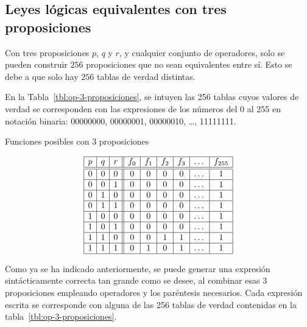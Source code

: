 \subsection{Leyes lógicas equivalentes con tres proposiciones}

Con tres proposiciones $p$, $q$ y $r$, y cualquier conjunto de operadores,
solo se pueden construir $256$ proposiciones que no sean equivalentes entre
sí. Esto se debe a que solo hay $256$ tablas de verdad distintas.

En la Tabla~\ref{tbl:op-3-proposiciones}, se intuyen las 256 tablas cuyos
valores de verdad se corresponden con las expresiones de los números del 0
al 255 en notación binaria: 00000000, 00000001, 00000010, \ldots, 11111111.


\begin{table}[h]
  \caption{Funciones posibles con 3 proposiciones}%
  \label{tbl:op-3-proposiciones}
  \centering
  $$
    \begin{array}{|c|c|c||c|c|c|c|c|c|}
      \hline
      p & q & r & f_0 & f_1 & f_2 & f_3 & \dots & f_{255} \\
      \hline
      \hline
      0 & 0 & 0 & 0 & 0 & 0 & 0 & \dots & 1 \\
      \hline
      0 & 0 & 1 & 0 & 0 & 0 & 0 & \dots & 1 \\
      \hline
      0 & 1 & 0 & 0 & 0 & 0 & 0 & \dots & 1 \\
      \hline
      0 & 1 & 1 & 0 & 0 & 0 & 0 & \dots & 1 \\
      \hline
      1 & 0 & 0 & 0 & 0 & 0 & 0 & \dots & 1 \\
      \hline
      1 & 0 & 1 & 0 & 0 & 0 & 0 & \dots & 1 \\
      \hline
      1 & 1 & 0 & 0 & 0 & 1 & 1 & \dots & 1 \\
      \hline
      1 & 1 & 1 & 0 & 1 & 0 & 1 & \dots & 1 \\
      \hline
    \end{array}
  $$
\end{table}

Como ya se ha indicado anteriormente, se puede generar una expresión
sintácticamente correcta tan grande como se desee, al combinar esas 3
proposiciones empleando operadores y los paréntesis necesarios. Cada
expresión escrita se corresponde con alguna de las 256 tablas de verdad
contenidas en la tabla~\ref{tbl:op-3-proposiciones}.

